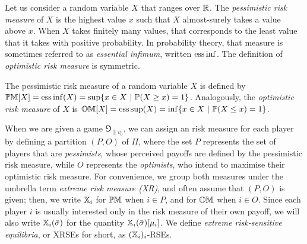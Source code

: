 Let us consider a random variable $X$ that ranges over $\mathbb{R}$. 
The \emph{pessimistic risk measure} of $X$ is the highest value $x$ such that $X$ almost-surely takes a value above $x$.
When $X$ takes finitely many values, that corresponds to the least value that it takes with positive probability.
In probability theory, that measure is sometimes referred to as \emph{essential infimum}, written $\operatorname{ess\,inf}$.
The definition of \emph{optimistic risk measure} is symmetric.

\begin{definition}
The pessimistic risk measure of a random variable $X$ is defined by
$\mathbb{PM}[X] = \operatorname{ess\,inf}(X) = \sup \{x \in X ~|~ \mathbb{P}(X \geq x) = 1\}$.
Analogously,  the \emph{optimistic risk measure} of $X$ is $\mathbb{OM}[X] = \operatorname{ess\,sup}(X) =  \inf \{x \in X ~|~ \mathbb{P}(X \leq x) = 1\}$.    
\end{definition}




When we are given a game $\Game_{\|v_0}$, we can assign an risk measure for each player by defining a partition $(P, O)$ of $\Pi$, where the set $P$ represents the set of players that are \emph{pessimists}, whose perceived payoffs are defined by the pessimistic risk measure, while $O$ represents the \emph{optimists}, who intend to maximise their optimistic risk measure.
For convenience, we group both measures under the umbrella term \emph{extreme risk measure (XR)}, and often assume that $(P, O)$ is given; %
then, we write $\mathbb{X}_i$ for $\mathbb{PM}$ when $i \in P$, and for $\mathbb{OM}$ when $i \in O$.
Since each player $i$ is usually interested only in the risk measure of their own payoff, we will also write $\mathbb{X}_i({\bar{\sigma}})$ for the quantity $\mathbb{X}_i({\bar{\sigma}})[\mu_i]$.
We define \emph{extreme risk-sensitive equilibria}, or XRSEs for short, as $(\mathbb{X}_i)_i$-RSEs.


